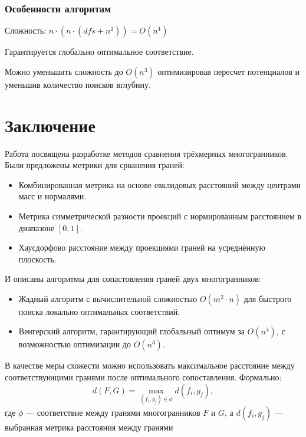 \documentclass[a4paper,14pt]{extarticle}
\theoremstyle{remark} %
\begin{document}
\subsubsection{Особенности алгоритам}
Сложность: $n \cdot (n \cdot (dfs + n^2)) = O(n^4)$\par
Гарантируется глобально оптимальное соответствие.\par
Можно уменьшить сложность до $O(n^3)$ оптимизировав пересчет потенциалов и уменьшив количество поисков вглубину.

\section{Заключение}

Работа посвящена разработке методов сравнения трёхмерных многогранников. Были предложены метрики для срванения граней:
\begin{itemize}
    \item Комбинированная метрика на основе евклидовых расстояний между центрами масс и нормалями.
    \item Метрика симметрической разности проекций с нормированным расстоянием в диапазоне $[0, 1]$.
    \item Хаусдорфово расстояние между проекциями граней на усреднённую плоскость.
\end{itemize}
И описаны  алгоритмы для сопастовления граней двух многогранников:
\begin{itemize}
    \item Жадный алгоритм с вычислительной сложностью $O(m^2 \cdot n)$ для быстрого поиска локально оптимальных соответствий.
    \item Венгерский алгоритм, гарантирующий глобальный оптимум за $O(n^4)$, с возможностью оптимизации до $O(n^3)$.
\end{itemize}

В качестве меры схожести можно использовать максимальное расстояние между соответствующими гранями после оптимального сопоставления.
Формально:
\begin{equation}
    d(F, G) = \max_{(f_i, g_j) \in \phi} d(f_i, g_j),
\end{equation}
где $\phi$ — соответствие между гранями многогранников $F$ и $G$, а $d(f_i, g_j)$ — выбранная метрика расстояния между гранями
\end{document}
